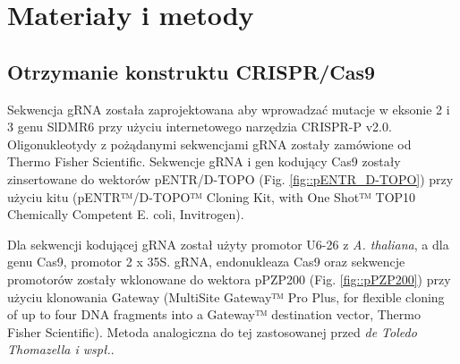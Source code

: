 \documentclass[two column, twoside, a4paper]{article}
\begin{document}
\section{Materiały i metody}

\subsection{Otrzymanie konstruktu CRISPR/Cas9}

Sekwencja gRNA została zaprojektowana aby wprowadzać mutacje w eksonie 2 i 3 genu SlDMR6 przy użyciu internetowego narzędzia CRISPR-P v2.0\autocite{Lei2014}. Oligonukleotydy z pożądanymi sekwencjami gRNA zostały zamówione od \textsf{Thermo Fisher Scientific}. Sekwencje gRNA i gen kodujący Cas9 zostały zinsertowane do wektorów pENTR\texttrademark/D-TOPO (Fig. \ref{fig::pENTR_D-TOPO}) przy użyciu kitu (pENTR™/D-TOPO™ Cloning Kit, with One Shot™ TOP10 Chemically Competent E. coli, \textsf{Invitrogen\texttrademark}).

Dla sekwencji kodującej gRNA został użyty promotor U6-26 z \textit{A. thaliana}, a dla genu Cas9, promotor 2 x 35S. gRNA, endonukleaza Cas9 oraz sekwencje promotorów zostały wklonowane do wektora pPZP200 (Fig. \ref{fig::pPZP200}) przy użyciu klonowania Gateway (MultiSite Gateway™ Pro Plus, for flexible cloning of up to four DNA fragments into a Gateway™ destination vector, \textsf{Thermo Fisher Scientific}). Metoda analogiczna do tej zastosowanej przed \textit{de Toledo Thomazella i wspł.}\autocite{deToledoThomazella2016}.
\end{document}

